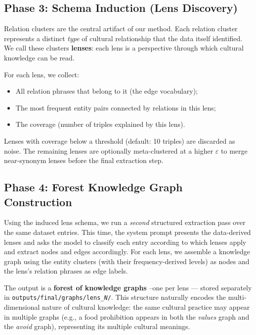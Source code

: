 \documentclass[11pt]{article}
\begin{document}
\subsection{Phase 3: Schema Induction (Lens Discovery)}

Relation clusters are the central artifact of our method.
Each relation cluster represents a distinct \emph{type} of cultural
relationship that the data itself identified.
We call these clusters \textbf{lenses}: each lens is a perspective through
which cultural knowledge can be read.

For each lens, we collect:
\begin{itemize}
  \item All relation phrases that belong to it (the edge vocabulary);
  \item The most frequent entity pairs connected by relations in this lens;
  \item The coverage (number of triples explained by this lens).
\end{itemize}

Lenses with coverage below a threshold (default: 10 triples) are discarded
as noise.
The remaining lenses are optionally meta-clustered at a higher
$\varepsilon$ to merge near-synonym lenses before the final extraction step.

\subsection{Phase 4: Forest Knowledge Graph Construction}

Using the induced lens schema, we run a \emph{second} structured
extraction pass over the same dataset entries.
This time, the system prompt presents the data-derived lenses and asks the
model to classify each entry according to which lenses apply and extract
nodes and edges accordingly.
For each lens, we assemble a knowledge graph using the entity clusters
(with their frequency-derived levels) as nodes and the lens's relation
phrases as edge labels.

The output is a \textbf{forest of knowledge graphs} --one per lens —
stored separately in \texttt{outputs/final/graphs/lens\_\textit{N}/}.
This structure naturally encodes the multi-dimensional nature of cultural
knowledge: the same cultural practice may appear in multiple graphs
(e.g., a food prohibition appears in both the \emph{values} graph and the
\emph{avoid} graph), representing its multiple cultural meanings.

\end{document}
